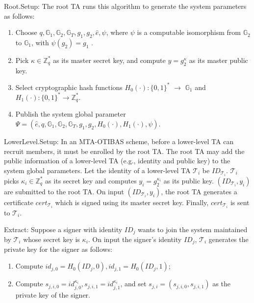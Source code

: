 \documentclass[10pt,journal,compsoc]{IEEEtran}
\begin{document}
\smallskip
{\sf Root.Setup}:
\smallskip
The root TA runs this algorithm to generate the system parameters as
follows:
\begin{enumerate}
  \item Choose $q,\mathbb{G}_1,\mathbb{G}_2,\mathbb{G}_T,g_1,g_2,\hat{e},\psi$,
  where $\psi$ is a computable isomorphism from
$\mathbb{G}_2$ to $\mathbb{G}_1$, with $\psi(g_2) = g_1$ \cite{Zhang10}.

  \item Pick $\kappa\in \mathbb{Z}_q^*$ as its master secret key, and
compute $y=g_2^\kappa$ as its master public key.

  \item Select cryptographic hash functions $H_0(\cdot):\{0,
  1\}^*$ $\rightarrow$ $\mathbb{G}_1$ and $H_1(\cdot):\{0, 1\}^*\rightarrow
  \mathbb{Z}_q^*$.

  \item Publish the system global parameter
$\Psi=(\hat{e}, q, \mathbb{G}_1, \mathbb{G}_2, \mathbb{G}_T, g_1,
g_2, H_0(\cdot), H_1(\cdot),\psi)$.
\end{enumerate}

\smallskip
{\sf LowerLevel.Setup}: In an MTA-OTIBAS scheme, before a lower-level TA can recruit members, it must be
enrolled by the root TA. The root TA may add the public information
of a lower-level TA (e.g., identity and public key) to the system
global parameters. Let the identity of a lower-level TA
$\mathcal{T}_i$ be $ID_{\mathcal{T}_i}$. $\mathcal{T}_i$ picks
$\kappa_i\in \mathbb{Z}_q^*$ as its secret key and computes
$y_i=g_2^{\kappa_i}$ as its public key. $(ID_{\mathcal{T}_i},y_i)$
are submitted to the root TA. On input $(ID_{\mathcal{T}_i},y_i)$,
the root TA generates a certificate $cert_{\mathcal{T}_i}$ which is
signed using its master secret key. Finally, $cert_{\mathcal{T}_i}$
is sent to $\mathcal{T}_i$.

\smallskip
{\sf Extract}: Suppose a signer with identity $ID_j$ wants to join
the system maintained by $\mathcal{T}_i$ whose secret key is
$\kappa_i$. On input the signer's identity $ID_j$, $\mathcal{T}_i$
generates the private key for the signer as follows:
\begin{enumerate}
  \item Compute $id_{j,0}=H_0(ID_j,0),id_{j,1}=H_0(ID_j,1)$;
  \item Compute $s_{j,i,0} =id_{j,0}^{\kappa_i},s_{j,i,1} =id_{j,1}^{\kappa_i}$, and set $s_{j,i}=(s_{j,i,0},s_{j,i,1})$ as the private key of the signer.
\end{enumerate}
\end{document}
